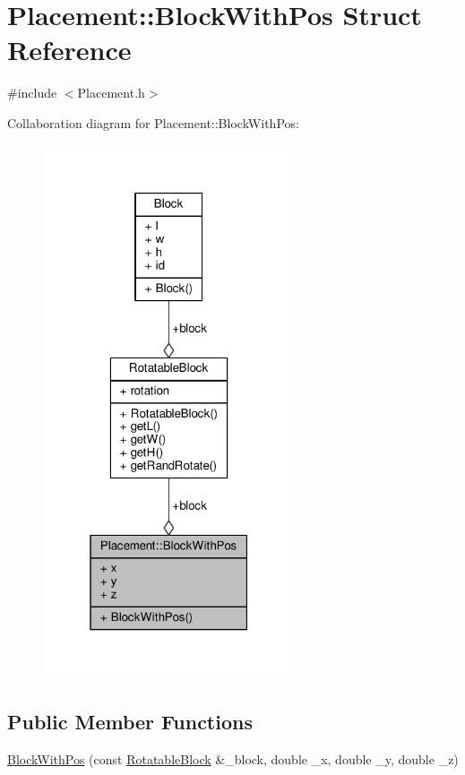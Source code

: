 \hypertarget{structPlacement_1_1BlockWithPos}{}\section{Placement\+:\+:Block\+With\+Pos Struct Reference}
\label{structPlacement_1_1BlockWithPos}


{\ttfamily \#include $<$Placement.\+h$>$}



Collaboration diagram for Placement\+:\+:Block\+With\+Pos\+:
\nopagebreak
\begin{figure}[H]
\begin{center}
\leavevmode
\includegraphics[width=211pt]{structPlacement_1_1BlockWithPos__coll__graph}
\end{center}
\end{figure}
\subsection*{Public Member Functions}
\begin{DoxyCompactItemize}
\item 
\hyperlink{structPlacement_1_1BlockWithPos_afb4a4cc160f62d32983def80899d01ac}{Block\+With\+Pos} (const \hyperlink{structRotatableBlock}{Rotatable\+Block} \&\+\_\+block, double \+\_\+x, double \+\_\+y, double \+\_\+z)
\end{DoxyCompactItemize}
